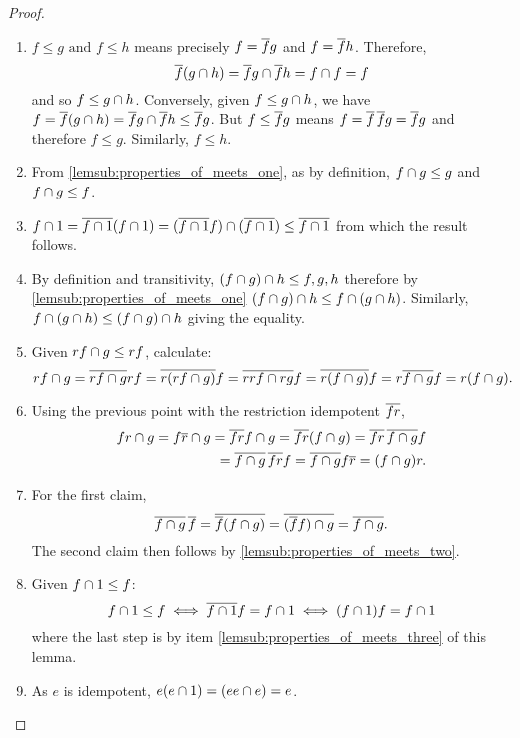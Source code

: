 \begin{proof}
  \prepprooflist
  \begin{enumerate}[{(}i{)}]
    \item $f\le g \text{ and } f \le h$ means precisely $f = \overline{f} g$ and $f = \overline{f} h$.
      Therefore,
      \[
        \overline{f} (g\cap h) =  \overline{f} g \cap \overline{f} h =  f\cap f = f
      \]
      and so $f \le g \cap h$. Conversely, given $f \le g\cap h$, we have
      $f = \overline{f} (g\cap h) = \overline{f} g \cap \overline{f} h \le \overline{f} g $. But
      $f \le \overline{f} g$ means $f = \overline{f}\,\overline{f} g = \overline{f}g$ and therefore
      $f \le g$. Similarly, $f \le h$.
    \item From \ref{lemsub:properties_of_meets_one}, as by definition, $f\cap g \le g$ and
      $f \cap g \le f$.
    \item $f\cap 1 = \overline{f\cap 1} (f \cap 1)= (\overline{f \cap 1} f ) \cap (\overline{f \cap 1})
      \le \overline{f \cap 1}$ from which the result follows. %
    \item By definition and transitivity, $(f\cap g)\cap h \le f, g, h$ therefore by
      \ref{lemsub:properties_of_meets_one} $(f \cap g) \cap h \le f \cap (g \cap h)$. Similarly,
      $f \cap (g \cap h) \le(f \cap g) \cap h$ giving the equality.
    \item Given  $r f \cap g \le r f$, calculate:
      \[
        r f\cap g
        = \overline{r f\cap g} r f
        = \overline{r (r f\cap g)} f
        = \overline{r r f\cap r g} f
        = \overline{r (f\cap g)} f
        = r \overline{f\cap g} f
        = r (f\cap g).
      \]
    \item Using the previous point with the restriction idempotent $\overline{f r}$,
      \begin{equation*}
        \begin{split}
          f r \meet g
          = f \restr{r} \meet g   %
          = \restr{f r }f \meet g  %
          = \restr{f r}(f\meet g)   %
          = \restr{f r}\, \restr{f\meet g} f \\ %
          = \restr{f\meet g}\, \restr{f r} f %
          = \restr{f\meet g} f \restr{r}  %
          = (f\meet g) r. %
        \end{split}
      \end{equation*}
    \item For the first claim,
      \[
        \overline{f\cap g}\, \overline{f} =\overline{\overline{f}(f\cap g)}\\
        =\overline{(\overline{f}f)\cap g} =\overline{f\cap g}.
      \]
      The second claim then follows by \ref{lemsub:properties_of_meets_two}.
    \item Given $ f \cap 1 \leq f$:
      \[
        f \cap 1 \leq f \iff  \overline{f \cap 1} f = f \cap 1 \iff  (f \cap 1) f = f \cap 1
      \]
      where the last step is by item \ref{lemsub:properties_of_meets_three} of this lemma.
    \item As $e$ is idempotent, $e (e\cap 1) = (e e \cap e) = e$.
  \end{enumerate}
\end{proof}

